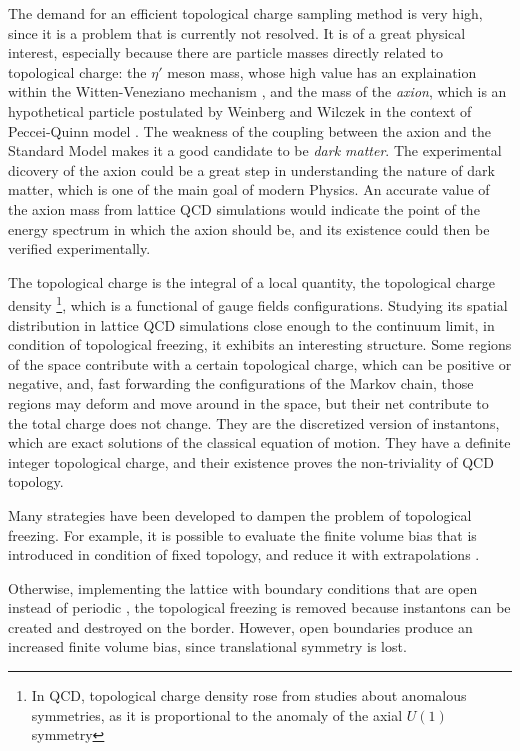 The demand for an efficient topological charge sampling method is very high, since it is a problem that is currently not resolved.
It is of a great physical interest, especially because there are particle masses directly related to topological charge:
the $\eta'$ meson mass, whose high value has an explaination within the Witten-Veneziano mechanism \cite{witten:1979-1, witten:1979-2, veneziano:1979},
and the mass of the \emph{axion}, which is an hypothetical particle postulated by Weinberg \cite{weinberg:1978} and Wilczek \cite{wilczek:1978}
in the context of Peccei-Quinn model \cite{peccei-quinn:1977-1, peccei-quinn:1977-2}.
The weakness of the coupling between the axion and the Standard Model makes it a good candidate to be \emph{dark matter}.
The experimental dicovery of the axion could be a great step in understanding the nature of dark matter, which is one of the main goal of modern Physics.
An accurate value of the axion mass from lattice QCD simulations would indicate the point of the energy spectrum in which the axion should be,
and its existence could then be verified experimentally.

The topological charge is the integral of a local quantity, the topological charge density%
\footnote{In QCD, topological charge density rose from studies about anomalous symmetries, as it is proportional to the anomaly of the axial $U(1)$ symmetry},
which is a functional of gauge fields configurations.
Studying its spatial distribution in lattice QCD simulations close enough to the continuum limit, in condition of topological freezing, it exhibits an interesting structure.
Some regions of the space contribute with a certain topological charge, which can be positive or negative, and,
fast forwarding the configurations of the Markov chain,
those regions may deform and move around in the space, but their net contribute to the total charge does not change.
They are the discretized version of instantons, which are exact solutions of the classical equation of motion.
They have a definite integer topological charge, and their existence proves the non-triviality of QCD topology.

Many strategies have been developed to dampen the problem of topological freezing.
For example, it is possible to evaluate the finite volume bias that is introduced in condition of fixed topology,
and reduce it with extrapolations \cite{brower:2003, aoki:2007}.

Otherwise, implementing the lattice with boundary conditions that are open instead of periodic \cite{luescher:2011},
the topological freezing is removed because instantons can be created and destroyed on the border.
However, open boundaries produce an increased finite volume bias, since translational symmetry is lost.


